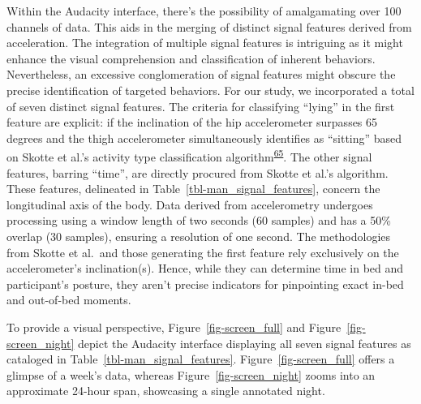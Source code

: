 \documentclass[
  10pt,
]{scrbook}
\begin{document}
Within the Audacity interface, there's the possibility of amalgamating
over 100 channels of data. This aids in the merging of distinct signal
features derived from acceleration. The integration of multiple signal
features is intriguing as it might enhance the visual comprehension and
classification of inherent behaviors. Nevertheless, an excessive
conglomeration of signal features might obscure the precise
identification of targeted behaviors. For our study, we incorporated a
total of seven distinct signal features. The criteria for classifying
``lying'' in the first feature are explicit: if the inclination of the
hip accelerometer surpasses 65 degrees and the thigh accelerometer
simultaneously identifies as ``sitting'' based on Skotte et al.'s
activity type classification
algorithm\textsuperscript{\protect\hyperlink{ref-skotte_detection_2014}{65}}.
The other signal features, barring ``time'', are directly procured from
Skotte et al.'s algorithm. These features, delineated in
Table~\ref{tbl-man_signal_features}, concern the longitudinal axis of
the body. Data derived from accelerometry undergoes processing using a
window length of two seconds (60 samples) and has a 50\% overlap (30
samples), ensuring a resolution of one second. The methodologies from
Skotte et al.~and those generating the first feature rely exclusively on
the accelerometer's inclination(s). Hence, while they can determine time
in bed and participant's posture, they aren't precise indicators for
pinpointing exact in-bed and out-of-bed moments.

To provide a visual perspective, Figure~\ref{fig-screen_full} and
Figure~\ref{fig-screen_night} depict the Audacity interface displaying
all seven signal features as cataloged in
Table~\ref{tbl-man_signal_features}. Figure~\ref{fig-screen_full} offers
a glimpse of a week's data, whereas Figure~\ref{fig-screen_night} zooms
into an approximate 24-hour span, showcasing a single annotated night.

\newpage

\begingroup

\footnotesize
\end{document}
